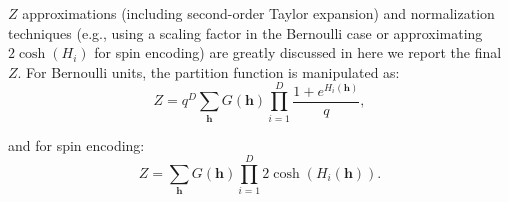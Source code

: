 \documentclass[prl,twocolumn]{revtex4-1}
\begin{document}
$Z$ approximations (including second-order Taylor expansion) and normalization techniques (e.g., using a scaling factor in the Bernoulli case or approximating $2\cosh(H_i)$ for spin encoding) are greatly discussed in \cite{baiesi} here we report the final $Z$.
For Bernoulli units, the partition function is manipulated as:
\begin{equation}
	Z = q^D\sum_{\mathbf{h}} G(\mathbf{h}) \prod_{i=1}^D \frac{1+e^{H_i(\mathbf{h})}}{q},
	\label{eq:Z_function_bernulli}
\end{equation}

and for spin encoding:
\begin{equation}
	Z = \sum_{\mathbf{h}} G(\mathbf{h}) \prod_{i=1}^D 2\cosh\left(H_i(\mathbf{h})\right).
	\label{eq:Z_function_spin}
\end{equation}



\end{document}
